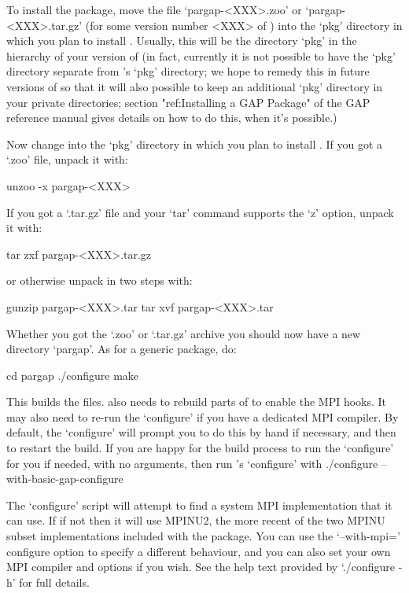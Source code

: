 To install the {\ParGAP} package, move  the  file  `pargap-<XXX>.zoo'  or
`pargap-<XXX>.tar.gz' (for some version number <XXX> of  {\ParGAP})  into
the `pkg' directory in which you plan to install {\ParGAP}. Usually, this
will be the directory `pkg' in the hierarchy of your version of  {\GAP}
(in fact, currently it is  not  possible  to  have  the  `pkg'  directory
separate from {\GAP}'s `pkg' directory; we hope to remedy this in  future
versions of {\ParGAP} so that it will also possible to keep an additional
`pkg' directory in your private directories; section "ref:Installing a GAP Package" 
of the GAP reference manual gives details on how to do  this,
when it's possible.)

Now change into  the  `pkg'  directory  in  which  you  plan  to  install
{\ParGAP}. If you got a `.zoo' file, unpack it with:

unzoo -x pargap-<XXX>

If you got a `.tar.gz' file and  your  `tar'  command  supports  the  `z'
option, unpack it with:

tar zxf pargap-<XXX>.tar.gz

or otherwise unpack in two steps with:

gunzip pargap-<XXX>.tar
tar xvf pargap-<XXX>.tar

Whether you got the `.zoo' or `.tar.gz' archive you should now have a new
directory `pargap'. As for a generic {\GAP} package, do:

\begintt
cd pargap
./configure
make
\endtt

This builds the {\ParGAP} files. {\ParGAP} also needs to rebuild parts of 
{\GAP} to enable the MPI hooks. It may also need to re-run the {\GAP} 
`configure' if you have a dedicated MPI compiler. By default, the {\ParGAP}
`configure' will prompt you to do this by hand if necessary, and then to 
restart the {\ParGAP} build. If you are happy for the {\ParGAP} build process
to run the {\GAP} `configure' for you if needed, with no arguments, then run 
{\ParGAP}'s `configure' with
\begintt
./configure --with-basic-gap-configure
\endtt

The `configure' script will attempt to find a system MPI implementation that
it can use. If if not then it will use MPINU2, the more recent of the two 
MPINU subset implementations included with the {\ParGAP} package. You can use 
the `--with-mpi=' configure option to specify a different behaviour, and you 
can also set your own MPI compiler and options if you wish. See the help text 
provided by  `./configure -h' for full details.

